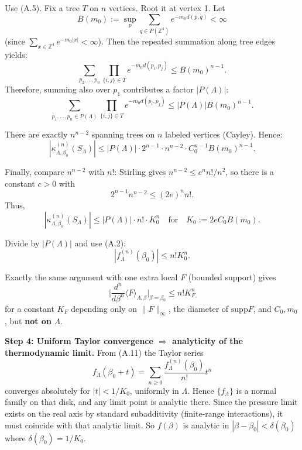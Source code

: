 Use (A.5). Fix a tree $T$ on $n$ vertices. Root it at vertex 1. Let
\begin{equation}
B(m_0) := \sup_{p} \sum_{q \in P(\mathbb{Z}^4)} e^{-m_0 d(p, q)} < \infty
\end{equation}
(since $\sum_{x \in \mathbb{Z}^4} e^{-m_0 |x|} < \infty$). Then the repeated summation along tree edges yields:
\begin{equation*}
\sum_{p_2, \dots, p_n} \prod_{\{i, j\} \in T} e^{-m_0 d(p_i, p_j)} \le B(m_0)^{n-1}.
\tag{A.7}
\end{equation*}
Therefore, summing also over $p_1$ contributes a factor $|P(\Lambda)|$:
\begin{equation*}
\sum_{p_1, \dots, p_n \in P(\Lambda)} \prod_{\{i, j\} \in T} e^{-m_0 d(p_i, p_j)} \le |P(\Lambda)| B(m_0)^{n-1}.
\tag{A.8}
\end{equation*}

There are exactly $n^{n-2}$ spanning trees on $n$ labeled vertices (Cayley). Hence:
\begin{equation*}
|\kappa_{\Lambda, \beta_0}^{(n)}(S_\Lambda)| \le |P(\Lambda)| \cdot 2^{n-1} \cdot n^{n-2} \cdot C_0^{n-1} B(m_0)^{n-1}.
\tag{A.9}
\end{equation*}

Finally, compare $n^{n-2}$ with $n!$: Stirling gives $n^{n-2} \le e^n n! / n^2$, so there is a constant $c > 0$ with
\begin{equation}
2^{n-1} n^{n-2} \le (2e)^n n!.
\end{equation}
Thus,
\begin{equation*}
|\kappa_{\Lambda, \beta_0}^{(n)}(S_\Lambda)| \le |P(\Lambda)| \cdot n! \cdot K_0^n \quad \text{for} \quad K_0 := 2e C_0 B(m_0).
\tag{A.10}
\end{equation*}

Divide by $|P(\Lambda)|$ and use (A.2):
\begin{equation*}
|f_\Lambda^{(n)}(\beta_0)| \le n! K_0^n.
\tag{A.11}
\end{equation*}

Exactly the same argument with one extra local $F$ (bounded support) gives
\begin{equation*}
\Big| \frac{d^n}{d\beta^n} \langle F \rangle_{\Lambda, \beta} \Big|_{\beta=\beta_0} \le n! K_F^n
\tag{A.12}
\end{equation*}
for a constant $K_F$ depending only on $\|F\|_\infty$, the diameter of $\mathrm{supp}F$, and $C_0, m_0$, but \textbf{not on $\Lambda$}.

\textbf{Step 4: Uniform Taylor convergence $\Rightarrow$ analyticity of the thermodynamic limit.}
From (A.11) the Taylor series
\begin{equation}
f_\Lambda(\beta_0 + t) = \sum_{n \ge 0} \frac{f_\Lambda^{(n)}(\beta_0)}{n!} t^n
\end{equation}
converges absolutely for $|t| < 1/K_0$, uniformly in $\Lambda$. Hence $\{f_\Lambda\}$ is a normal family on that disk, and any limit point is analytic there. Since the pressure limit exists on the real axis by standard subadditivity (finite-range interactions), it must coincide with that analytic limit. So $f(\beta)$ is analytic in $|\beta - \beta_0| < \delta(\beta_0)$ where $\delta(\beta_0) = 1/K_0$.

